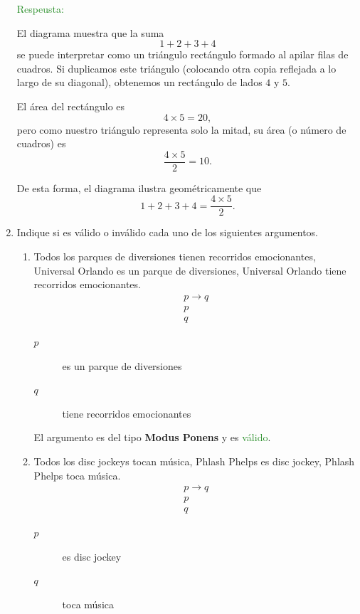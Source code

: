 \documentclass[12pt,letterpaper]{exam}
\begin{document}
\begin{enumerate}
  	\vspace{1em}
  	\textcolor{ForestGreen}{Respeusta:} 

  	El diagrama muestra que la suma
  	\[
  	1+2+3+4
  	\]
  	se puede interpretar como un triángulo rectángulo formado al apilar filas de 
  	cuadros. Si duplicamos este triángulo (colocando otra copia reflejada a lo largo 
  	de su diagonal), obtenemos un rectángulo de lados $4$ y $5$. 

  	El área del rectángulo es
  	\[
  	4 \times 5 = 20,
  	\]
  	pero como nuestro triángulo representa solo la mitad, su área (o número de cuadros)
  	es
  	\[
  	\frac{4 \times 5}{2} = 10.
  	\]

  	De esta forma, el diagrama ilustra geométricamente que
  	\[
  	1+2+3+4 = \frac{4 \times 5}{2}.
  	\]


  \item Indique si es válido o inválido cada uno de los siguientes argumentos.
  
  
\begin{enumerate}[label=\alph*)]

\item Todos los parques de diversiones tienen recorridos emocionantes, Universal Orlando es un parque de diversiones, Universal Orlando tiene recorridos emocionantes.
\[
\begin{array}{c}
p \to q \\
p \\
\hline
q
\end{array}
\]
\begin{description}
  \item[$p$] es un parque de diversiones
  \item[$q$] tiene recorridos emocionantes
\end{description}

El argumento es del tipo \textbf{Modus Ponens} y es \textcolor{ForestGreen}{válido}.

\item Todos los disc jockeys tocan música, Phlash Phelps es disc jockey, Phlash Phelps toca música.
\[
\begin{array}{c}
p \to q \\
p \\
\hline
q
\end{array}
\]
\begin{description}
  \item[$p$] es disc jockey
  \item[$q$] toca música
\end{description}


\end{enumerate}
\end{enumerate}
\end{document}
